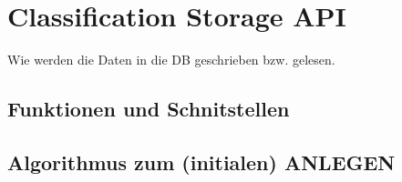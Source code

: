 \section{Classification Storage API}
    Wie werden die Daten in die DB geschrieben bzw. gelesen.

    \subsection{Funktionen und Schnitstellen}

    \subsection{Algorithmus zum (initialen) ANLEGEN}
        